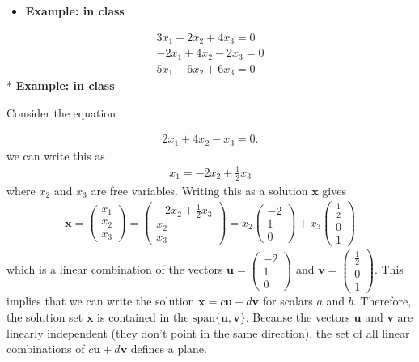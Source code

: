 \documentclass[
]{book}
\providecommand{\tightlist}{%
  \setlength{\itemsep}{0pt}\setlength{\parskip}{0pt}}
\theoremstyle{definition}
\theoremstyle{definition}
\theoremstyle{definition}
\theoremstyle{remark}
\begin{document}
\begin{itemize}
\tightlist
\item
  \textbf{Example: in class}
\end{itemize}

\[
\begin{aligned}
3 x_1 - 2 x_2 + 4 x_3 = 0 \\
- 2 x_1 + 4 x_2 - 2 x_3 = 0 \\
5 x_1 - 6 x_2 + 6 x_3 = 0
\end{aligned}
\]
* \textbf{Example: in class}

Consider the equation

\[
\begin{aligned}
2x_1 + 4 x_2 - x_3 = 0.
\end{aligned}
\]
we can write this as
\[
\begin{aligned}
x_1 = -2 x_2 + \frac{1}{2} x_3
\end{aligned}
\]
where \(x_2\) and \(x_3\) are free variables. Writing this as a solution \(\mathbf{x}\) gives
\[
\begin{aligned}
\mathbf{x} = \begin{pmatrix} x_1 \\ x_2 \\ x_3 \end{pmatrix} = \begin{pmatrix} -2 x_2 + \frac{1}{2} x_3 \\ x_2 \\ x_3 \end{pmatrix} = 
x_2 \begin{pmatrix} -2 \\ 1 \\ 0 \end{pmatrix} + 
x_3 \begin{pmatrix} \frac{1}{2} \\ 0 \\ 1 \end{pmatrix}
\end{aligned}
\]
which is a linear combination of the vectors \(\mathbf{u} = \begin{pmatrix} -2 \\ 1 \\ 0 \end{pmatrix}\) and \(\mathbf{v} = \begin{pmatrix} \frac{1}{2} \\ 0 \\ 1 \end{pmatrix}\). This implies that we can write the solution \(\mathbf{x} = c \mathbf{u} + d \mathbf{v}\) for scalars \(a\) and \(b\). Therefore, the solution set \(\mathbf{x}\) is contained in the \(\mbox{span}\{\mathbf{u}, \mathbf{v}\}\). Because the vectors \(\mathbf{u}\) and \(\mathbf{v}\) are linearly independent (they don't point in the same direction), the set of all linear combinations of \(c \mathbf{u} + d \mathbf{v}\) defines a plane.
\end{document}
